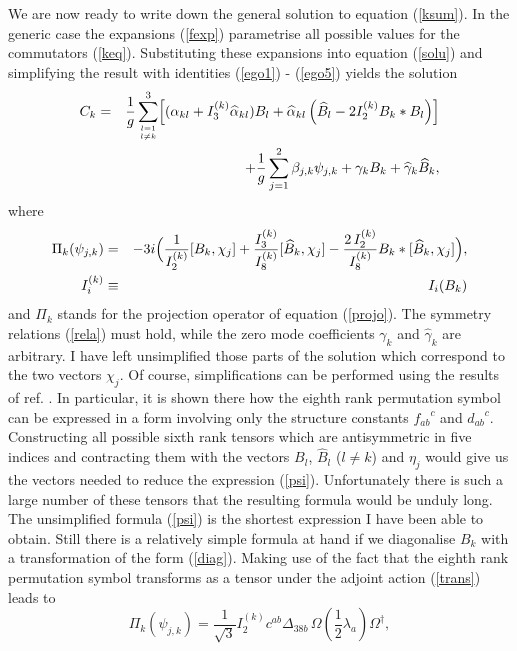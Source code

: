\documentclass[a4paper,12pt]{article}
\begin{document}
We are now ready to write down the general solution to equation (\ref{ksum}). In the generic case the expansions (\ref{fexp}) parametrise all possible values for the commutators (\ref{keq}). Substituting these expansions into equation (\ref{solu}) and simplifying the result with identities (\ref{ego1}) - (\ref{ego5}) yields the solution 
\begin{eqnarray}\label{res}
C_k &=& \frac{1}{g} \sum_{l=1 \atop l \neq k}^3 \Bigl[ (\alpha_{kl} + I_3^{(k)} \widehat{\alpha}_{kl}) B_l + \widehat{\alpha}_{kl} \left( \widehat{B}_l - 2 I_2^{(k)} B_k * B_l \right) \Bigr] \nonumber \\*
&& + \frac{1}{g} \sum_{j=1}^2 \beta_{j,k} \psi_{j,k} + \gamma_k B_k + \widehat{\gamma}_k \widehat{B}_k,
\end{eqnarray}
where
\begin{eqnarray} \label{psi}
\Pi_k (\psi_{j,k}) &=& -3i \Bigl( \frac{1}{I_2^{(k)}} [B_k, \chi_j] + \frac{I_3^{(k)}}{I_8^{(k)}} [\widehat{B}_k, \chi_j] - \frac{2 \, I_2^{(k)}}{I_8^{(k)}} B_k *[\widehat{B}_k,\chi_j] \Bigr), \nonumber \\*
I_i^{(k)} &\equiv& I_i(B_k) 
\end{eqnarray}
and $\Pi_k$ stands for the projection operator of equation (\ref{projo}). The symmetry relations (\ref{rela}) must hold, while the zero mode coefficients $\gamma_k$ and $\widehat{\gamma}_k$ are arbitrary. I have left unsimplified those parts of the solution which correspond to the two vectors $\chi_j$. Of course, simplifications can be performed using the results of ref. \cite{ammp}. In particular, it is shown there how the eighth rank permutation symbol can be expressed in a form involving only the structure constants ${f_{ab}}^c$ and ${d_{ab}}^c$. Constructing all possible sixth rank tensors which are antisymmetric in five indices and contracting them with the vectors $B_l$, $\widehat{B}_l$ ($l \neq k$) and $\eta_j$ would give us the vectors needed to reduce the expression (\ref{psi}). Unfortunately there is such a large number of these tensors that the resulting formula would be unduly long. The unsimplified formula (\ref{psi}) is the shortest expression I have been able to obtain. Still there is a relatively simple formula at hand if we diagonalise $B_k$ with a transformation of the form (\ref{diag}). Making use of the fact that the eighth rank permutation symbol transforms as a tensor under the adjoint action (\ref{trans}) leads to
\begin{equation} \label{sipsi}
\Pi_k (\psi_{j,k}) = \frac{1}{\sqrt{3}} I_2^{(k)} c^{ab} \Delta_{38b} \, \Omega \! \left( \frac{1}{2} \lambda_a \right) \! \Omega^{\dagger},
\end{equation}
\end{document}
